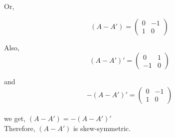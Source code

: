 \documentclass{article}
\begin{document}
\begin{itemize}
 Or,
 
 \[
 (A-A')=
 \begin{pmatrix}
 0 & -1\\
 1 & 0 
 \end{pmatrix}
 \] 

Also,\\

 \[
 (A-A')'=
 \begin{pmatrix}
 0 & 1\\
-1 & 0
 \end{pmatrix}
\]

and\\
\[
 -(A-A')'=
 \begin{pmatrix}
0 & -1\\
1 & 0
 \end{pmatrix}
 \]\\
 
 we get, $(A-A')=-(A-A')'$\\
 
 Therefore, $(A-A')$ is skew-symmetric.\\

\end{itemize}
\end{document}
